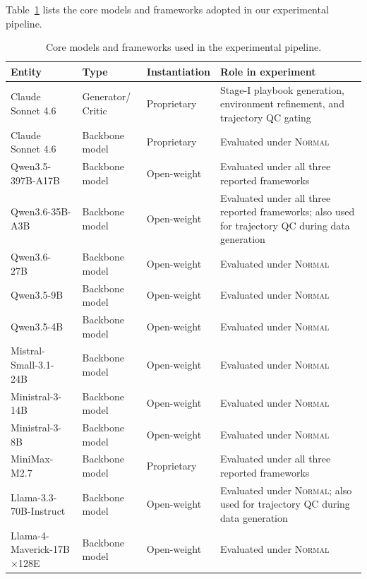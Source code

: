 Table~\ref{tab:model-suite} lists the core models and frameworks adopted in our experimental pipeline.

\begin{table}[t]
\centering
\small
\caption{Core models and frameworks used in the experimental pipeline.}
\label{tab:model-suite}
\renewcommand{\arraystretch}{1.2}
\begin{tabularx}{\linewidth}{p{4.5cm}p{2.2cm}p{2cm}X}
\toprule
Entity & Type & Instantiation & Role in experiment \\
\midrule
Claude Sonnet 4.6~\citep{anthropic2026claude46} & Generator/ Critic & Proprietary & Stage-I playbook generation, environment refinement, and trajectory QC gating \\
\midrule
Claude Sonnet 4.6~\citep{anthropic2026claude46} & Backbone model & Proprietary & Evaluated under \textsc{Normal} \\
Qwen3.5-397B-A17B~\citep{qwen3.5} & Backbone model & Open-weight & Evaluated under all three reported frameworks \\
Qwen3.6-35B-A3B~\citep{qwen36_35b_a3b} & Backbone model & Open-weight & Evaluated under all three reported frameworks; also used for trajectory QC during data generation \\
Qwen3.6-27B~\citep{qwen3.6-27b} & Backbone model & Open-weight & Evaluated under \textsc{Normal} \\
Qwen3.5-9B~\citep{qwen3.5} & Backbone model & Open-weight & Evaluated under \textsc{Normal} \\
Qwen3.5-4B~\citep{qwen3.5} & Backbone model & Open-weight & Evaluated under \textsc{Normal} \\
Mistral-Small-3.1-24B~\citep{liu2026ministral} & Backbone model & Open-weight & Evaluated under \textsc{Normal} \\
Ministral-3-14B~\citep{liu2026ministral} & Backbone model & Open-weight & Evaluated under \textsc{Normal} \\
Ministral-3-8B~\citep{liu2026ministral} & Backbone model & Open-weight & Evaluated under \textsc{Normal} \\
MiniMax-M2.7~\citep{minimax_m2.7} & Backbone model & Proprietary & Evaluated under all three reported frameworks \\
Llama-3.3-70B-Instruct~\citep{grattafiori2024llama} & Backbone model & Open-weight & Evaluated under \textsc{Normal}; also used for trajectory QC during data generation \\
Llama-4-Maverick-17B$\times$128E~\citep{llama4_maverick} & Backbone model & Open-weight & Evaluated under \textsc{Normal} \\

\end{tabularx}
\end{table}
